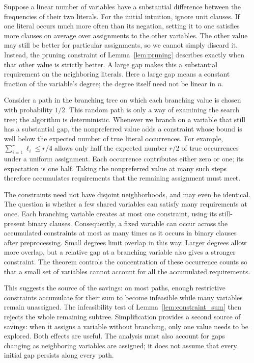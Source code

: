 \documentclass[11pt,a4paper]{article}
\theoremstyle{definition}
\theoremstyle{remark}
\begin{document}
Suppose a linear number of variables have a substantial difference between
the frequencies of their two literals. For the initial intuition, ignore
unit clauses. If one literal occurs much more often than its negation,
setting it to one satisfies more clauses on average over assignments to
the other variables. The other value may still be better for particular
assignments, so we cannot simply discard it. Instead, the pruning constraint
of Lemma~\ref{lem:pruning} describes exactly when that other value is strictly
better. A large gap makes this a substantial requirement on the neighboring
literals. Here a large gap means a constant fraction of the variable's
degree; the degree itself need not be linear in $n$.

Consider a path in the branching tree on which each branching value is
chosen with probability $1/2$. This random path is only a way of examining
the search tree; the algorithm is deterministic. Whenever we branch on a
variable that still has a substantial gap, the nonpreferred value adds a
constraint whose bound is well below the expected number of true literal
occurrences. For example, $\sum_{i=1}^r\ell_i\le r/4$ allows only half the
expected number $r/2$ of true occurrences under a uniform assignment.
Each occurrence contributes either zero or one; its expectation is one
half. Taking the nonpreferred value at many such steps therefore accumulates
requirements that the remaining assignment must meet.

The constraints need not have disjoint neighborhoods, and may even be
identical. The question is whether a few shared variables can satisfy many
requirements at once. Each branching variable creates at most one
constraint, using its still-present binary clauses. Consequently, a fixed
variable can occur across the accumulated constraints at most as many times
as it occurs in binary clauses after preprocessing. Small degrees limit
overlap in this way. Larger degrees allow more overlap, but a relative gap
at a branching variable also gives a stronger constraint. The theorem
controls the concentration of these occurrence counts so that a small set
of variables cannot account for all the accumulated requirements.

This suggests the source of the savings: on most paths, enough restrictive
constraints accumulate for their sum to become infeasible while many
variables remain unassigned. The infeasibility test of
Lemma~\ref{lem:constraint_sum} then rejects the whole remaining subtree.
Simplification provides a second source of savings: when it assigns a
variable without branching, only one value needs to be explored. Both
effects are useful. The analysis must also account for gaps changing as
neighboring variables are assigned; it does not assume that every initial
gap persists along every path.
\end{document}
